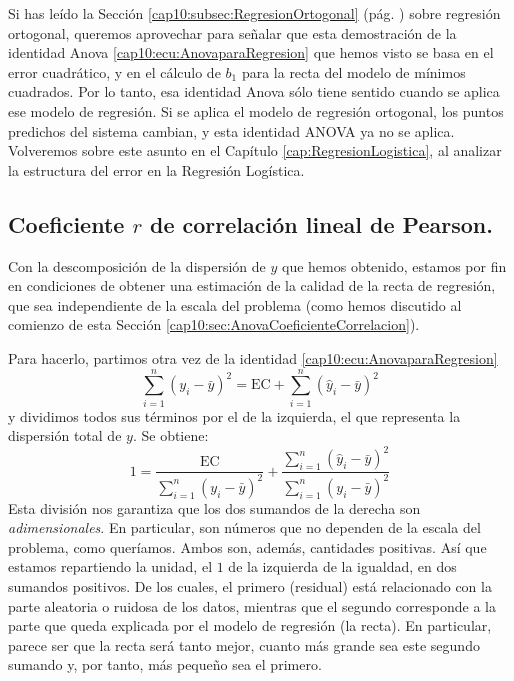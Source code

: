 Si has leído la Sección \ref{cap10:subsec:RegresionOrtogonal} (pág. \pageref{cap10:subsec:RegresionOrtogonal}) sobre regresión ortogonal, queremos aprovechar para señalar que esta demostración de la identidad Anova \ref{cap10:ecu:AnovaparaRegresion} que hemos visto se basa en el error cuadrático, y en el cálculo de $b_1$ para la recta del modelo de mínimos cuadrados. Por lo tanto, esa identidad Anova sólo tiene sentido cuando se aplica ese modelo de regresión. Si se aplica el modelo de regresión ortogonal, los puntos predichos del sistema cambian, y esta identidad ANOVA ya no se aplica. Volveremos sobre este asunto en el Capítulo \ref{cap:RegresionLogistica}, al analizar la estructura del error en la Regresión Logística.

\subsection{Coeficiente $r$ de correlación lineal de Pearson.}
\label{cap10:subsec:CoeficienteRPearson}

Con la descomposición de la dispersión de $y$ que hemos obtenido, estamos por fin en condiciones de obtener una estimación de la calidad de la recta de regresión, que sea independiente de la escala del problema (como hemos discutido al comienzo de esta Sección \ref{cap10:sec:AnovaCoeficienteCorrelacion}).

Para hacerlo, partimos otra vez de la identidad \ref{cap10:ecu:AnovaparaRegresion}
\[
\displaystyle\sum_{i=1}^{n}(y_i-\bar y)^2 = \mbox{EC}+\sum_{i=1}^n(\hat y_i-\bar y)^2
\]
y dividimos todos sus términos por el de la izquierda, el que representa la dispersión total de $y$. Se obtiene:
\begin{equation}\label{cap10:ecu:ecuacionAnovaAdimensional}
1 =
\dfrac{\mbox{EC}}{\displaystyle\sum_{i=1}^{n}(y_i-\bar y)^2}
+
\dfrac{\displaystyle\sum_{i=1}^n(\hat y_i-\bar y)^2}{\displaystyle\sum_{i=1}^{n}(y_i-\bar y)^2}
\end{equation}
Esta división nos garantiza que los dos sumandos de la derecha son {\em adimensionales}. En particular, son números que no dependen de la escala del problema, como queríamos. Ambos son, además, cantidades positivas. Así que estamos repartiendo la unidad, el $1$ de la izquierda de la igualdad, en dos sumandos positivos. De los cuales, el primero (residual) está relacionado con la parte aleatoria o ruidosa de los datos, mientras que el segundo corresponde a la parte que queda explicada por el modelo de regresión (la recta). En particular, parece ser que la recta será tanto mejor, cuanto más grande sea este segundo sumando y, por tanto, más pequeño sea el primero.


